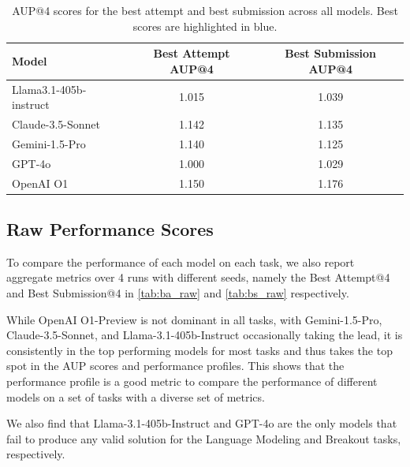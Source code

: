 \documentclass[]{fairmeta}
\begin{document}
\begin{table}[!h]
    \centering
    \begin{NiceTabular}{lcc}
        \toprule
        Model & Best Attempt AUP@4 & Best Submission AUP@4 \\
        \midrule
        Llama3.1-405b-instruct & 1.015 & 1.039 \\
        Claude-3.5-Sonnet & 1.142 & 1.135 \\
        Gemini-1.5-Pro & 1.140 & 1.125 \\
        GPT-4o & 1.000 & 1.029 \\
        OpenAI O1 & \colorbox{blue!15}{1.150} & \colorbox{blue!15}{1.176} \\
        \bottomrule
    \end{NiceTabular}
    \caption{AUP@4 scores for the best attempt and best submission across all models. Best scores are highlighted in \colorbox{blue!15}{blue}.}
    \label{tab:aup_scores}
\end{table}




\subsection{Raw Performance Scores}

To compare the performance of each model on each task, we also report aggregate metrics over 4 runs with different seeds, namely the Best Attempt@4 and Best Submission@4 in \autoref{tab:ba_raw} and \autoref{tab:bs_raw} respectively. 
%

While OpenAI O1-Preview is not dominant in all tasks, with Gemini-1.5-Pro, Claude-3.5-Sonnet, and Llama-3.1-405b-Instruct occasionally taking the lead, it is consistently in the top performing models for most tasks and thus takes the top spot in the AUP scores and performance profiles.
%
This shows that the performance profile is a good metric to compare the performance of different models on a set of tasks with a diverse set of metrics.

We also find that Llama-3.1-405b-Instruct and GPT-4o are the only models that fail to produce any valid solution for the Language Modeling and Breakout tasks, respectively.
\end{document}
